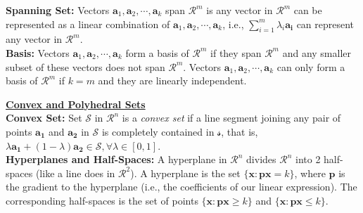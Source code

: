 


{\bf Spanning Set:}  Vectors ${\mathbf a_1},{\mathbf a_2},\cdots,{\mathbf a_k}$ span $\mathcal{R}^m$ is any vector in $\mathcal{R}^m$ can be represented as a linear combination of ${\mathbf a_1},{\mathbf a_2},\cdots,{\mathbf a_k}$, i.e., $\sum_{i=1}^m\lambda_i\mathbf{a_i}$ can represent any vector in $\mathcal{R}^m$. \\

{\bf Basis:} Vectors ${\mathbf a_1},{\mathbf a_2},\cdots,{\mathbf a_k}$ form a basis of $\mathcal{R}^m$ if they span $\mathcal{R}^m$ and any smaller subset of these vectors does not span $\mathcal{R}^m$. Vectors ${\mathbf a_1},{\mathbf a_2},\cdots,{\mathbf a_k}$ can only form a basis of $\mathcal{R}^m$ if $k = m$ and they are linearly independent.

\newpage \underline{\bf Convex and Polyhedral Sets} \\

{\bf Convex Set:} Set $\mathcal{S}$ in $\mathcal{R}^n$ is a {\it convex set} if a line segment joining any pair of points $\mathbf{a_1}$ and $\mathbf{a_2}$ in $\mathcal{S}$ is completely contained in $\mathcal{s}$, that is, $\lambda\mathbf{a_1} + (1-\lambda)\mathbf{a_2} \in \mathcal{S}, \forall \lambda \in [0,1]$. \\

{\bf Hyperplanes and Half-Spaces:} A hyperplane in $\mathcal{R}^n$ divides $\mathcal{R}^n$ into 2 half-spaces (like a line does in $\mathcal{R}^2$). A hyperplane is the set $\{\mathbf{x}: \mathbf{p}\mathbf{x} = k\}$, where $\mathbf{p}$ is the gradient to the hyperplane (i.e., the coefficients of our linear expression). The corresponding half-spaces is the set of points $\{\mathbf{x}: \mathbf{p}\mathbf{x} \ge k\}$ and $\{\mathbf{x}: \mathbf{p}\mathbf{x} \le k\}$. \\

